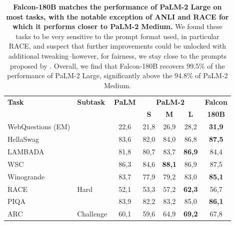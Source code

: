 \documentclass{article}
\DeclareRobustCommand{\performance}[1]{\textcolor{JungleGreen}{#1}}
\begin{document}
\begin{table}[h]
\vspace{-0.1in}
\caption{\performance{\textbf{Falcon-180B matches the performance of PaLM-2 Large on most tasks, with the notable exception of ANLI and RACE for which it performs closer to PaLM-2 Medium.}} We found these tasks to be very sensitive to the prompt format used, in particular RACE, and suspect that further improvements could be unlocked with additional tweaking--however, for fairness, we stay close to the prompts proposed by \citet{brown2020gpt3}. Overall, we find that Falcon-180B recovers 99.5\% of the performance of PaLM-2 Large, significantly above the 94.8\% of PaLM-2 Medium.}
\label{tab:palm-2}
\centering
\vspace{0.1in}
\begin{tabular}{llccccc}
\toprule
\textbf{Task}                     & \textbf{Subtask} & \textbf{PaLM} & \multicolumn{3}{c}{\textbf{PaLM-2}}           & \textbf{Falcon}      \\
                     & \textbf{} & \textbf{} & \textbf{S} & \textbf{M} & \textbf{L} & \textbf{180B} \\ \midrule
WebQuestions (EM)    &           & 22,6          & 21,8              & 26,9              & 28,2              & \textbf{31,9}        \\ \midrule
HellaSwag            &           & 83,6          & 82,0              & 84,0              & 86,8              & \textbf{87,5}        \\
LAMBADA              &           & 81,8          & 80,7              & 83,7              & \textbf{86,9}     & 84,4                 \\ \midrule
WSC                  &           & 86,3          & 84,6              & \textbf{88,1}     & 86,9              & 87,5                 \\
Winogrande           &           & 83,7          & 77,9              & 79,2              & 83,0              & \textbf{85,1}        \\ \midrule
RACE                 & Hard      & 52,1          & 53,3              & 57,2        & \textbf{62,3}     & 56,7                 \\ \midrule
PIQA                 &           & 83,9          & 82,2              & 83,2              & 85,0              & \textbf{86,1}        \\
ARC                  & Challenge & 60,1          & 59,6              & 64,9              & \textbf{69,2}     & 67,8                 \\

\end{tabular}
\end{table}
\end{document}
